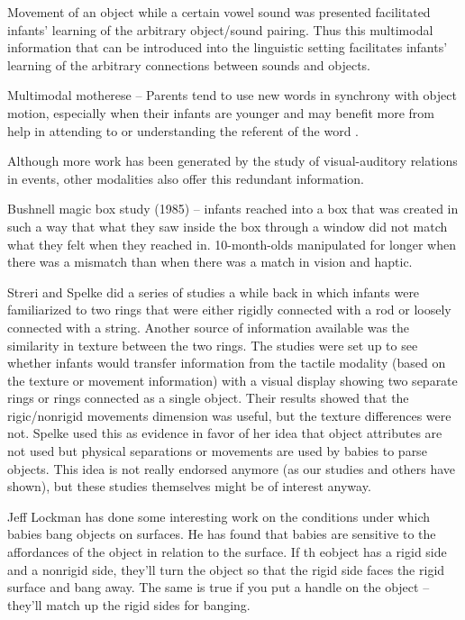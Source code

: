 Movement of an object while a certain vowel sound was presented
facilitated infants' learning of the arbitrary object/sound pairing.
Thus this multimodal information that can be introduced into the
linguistic setting facilitates infants' learning of the arbitrary
connections between sounds and objects.

Multimodal motherese -- Parents tend to use new words in synchrony
with object motion, especially when their infants are younger and may
benefit more from help in attending to or understanding the referent
of the word \cite{gogate00study}.



Although more work has been generated by the study of visual-auditory
relations in events, other modalities also offer this redundant
information.

Bushnell magic box study (1985) -- infants reached into a box
that was created in such a way that what they saw inside the box
through a window did not match what they felt when they reached in.
10-month-olds manipulated for longer when there was a mismatch than
when there was a match in vision and haptic.




Streri and Spelke did a series of studies a while back in which
infants were familiarized to two rings that were either rigidly
connected with a rod or loosely connected with a string.  Another
source of information available was the similarity in texture between
the two rings.  The studies were set up to see whether infants would
transfer information from the tactile modality (based on the texture
or movement information) with a visual display showing two separate
rings or rings connected as a single object.  Their results showed
that the rigic/nonrigid movements dimension was useful, but the
texture differences were not. Spelke used this as evidence in favor of
her idea that object attributes are not used but physical separations
or movements are used by babies to parse objects.  This idea is not
really endorsed anymore (as our studies and others have shown), but
these studies themselves might be of interest anyway.



Jeff Lockman has done some interesting work on the conditions under
which babies bang objects on surfaces.  He has found that babies are
sensitive to the affordances of the object in relation to the surface.
If th eobject has a rigid side and a nonrigid side, they'll turn the
object so that the rigid side faces the rigid surface and bang away.
The same is true if you put a handle on the object -- they'll match up
the rigid sides for banging.



